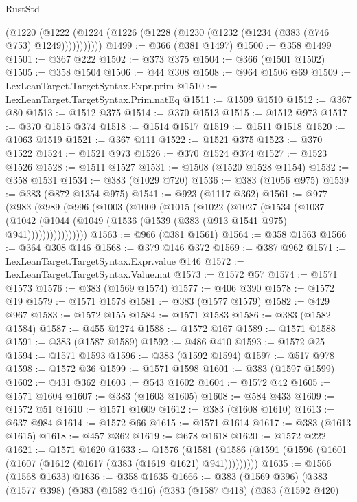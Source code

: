 \begin{lexlean}{RustStd}
\begin{coremodule}
        (@1220 (@1222 (@1224 (@1226 (@1228 (@1230 (@1232 (@1234 (@383 (@746 @753) @1249)))))))))))
@1499 := @366 (@381 @1497)
@1500 := @358 @1499
@1501 := @367 @222
@1502 := @373 @375
@1504 := @366 (@1501 @1502)
@1505 := @358 @1504
@1506 := @44 @308
@1508 := @964 @1506 @69
@1509 := LexLeanTarget.TargetSyntax.Expr.prim
@1510 := LexLeanTarget.TargetSyntax.Prim.natEq
@1511 := @1509 @1510
@1512 := @367 @80
@1513 := @1512 @375
@1514 := @370 @1513
@1515 := @1512 @973
@1517 := @370 @1515 @374
@1518 := @1514 @1517
@1519 := @1511 @1518
@1520 := @1063 @1519
@1521 := @367 @111
@1522 := @1521 @375
@1523 := @370 @1522
@1524 := @1521 @973
@1526 := @370 @1524 @374
@1527 := @1523 @1526
@1528 := @1511 @1527
@1531 := @1508 (@1520 @1528 @1154)
@1532 := @358 @1531
@1534 := @383 (@1029 @720)
@1536 := @383 (@1056 @975)
@1539 := @383 (@872 @1354 @975)
@1541 := @923 (@1117 @362)
@1561 := @977
    (@983
      (@989
        (@996
          (@1003
            (@1009
              (@1015
                (@1022
                  (@1027
                    (@1534
                      (@1037
                        (@1042
                          (@1044 (@1049 (@1536 (@1539 (@383 (@913 @1541 @975) @941))))))))))))))))
@1563 := @966 (@381 @1561)
@1564 := @358 @1563
@1566 := @364 @308 @146
@1568 := @379 @146 @372
@1569 := @387 @962
@1571 := LexLeanTarget.TargetSyntax.Expr.value @146
@1572 := LexLeanTarget.TargetSyntax.Value.nat
@1573 := @1572 @57
@1574 := @1571 @1573
@1576 := @383 (@1569 @1574)
@1577 := @406 @390
@1578 := @1572 @19
@1579 := @1571 @1578
@1581 := @383 (@1577 @1579)
@1582 := @429 @967
@1583 := @1572 @155
@1584 := @1571 @1583
@1586 := @383 (@1582 @1584)
@1587 := @455 @1274
@1588 := @1572 @167
@1589 := @1571 @1588
@1591 := @383 (@1587 @1589)
@1592 := @486 @410
@1593 := @1572 @25
@1594 := @1571 @1593
@1596 := @383 (@1592 @1594)
@1597 := @517 @978
@1598 := @1572 @36
@1599 := @1571 @1598
@1601 := @383 (@1597 @1599)
@1602 := @431 @362
@1603 := @543 @1602
@1604 := @1572 @42
@1605 := @1571 @1604
@1607 := @383 (@1603 @1605)
@1608 := @584 @433
@1609 := @1572 @51
@1610 := @1571 @1609
@1612 := @383 (@1608 @1610)
@1613 := @637 @984
@1614 := @1572 @66
@1615 := @1571 @1614
@1617 := @383 (@1613 @1615)
@1618 := @457 @362
@1619 := @678 @1618
@1620 := @1572 @222
@1621 := @1571 @1620
@1633 := @1576
    (@1581 (@1586 (@1591 (@1596 (@1601 (@1607 (@1612 (@1617 (@383 (@1619 @1621) @941)))))))))
@1635 := @1566 (@1568 @1633)
@1636 := @358 @1635
@1666 := @383
    (@1569 @396)
    (@383
      (@1577 @398)
      (@383
        (@1582 @416)
        (@383
          (@1587 @418)
          (@383
            (@1592 @420)

\end{coremodule}
\end{lexlean}
